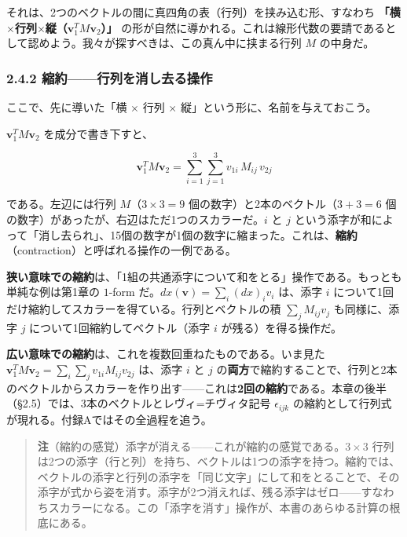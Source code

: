 \documentclass[a4paper,12pt,openany]{book}
\begin{document}
それは、2つのベクトルの間に真四角の表（行列）を挟み込む形、すなわち
\textbf{「横}\(\times\)\textbf{行列}\(\times\)\textbf{縦（}\(\mathbf{v}_1^T M \mathbf{v}_2\)\textbf{）」}
の形が自然に導かれる。これは線形代数の要請であるとして認めよう。我々が探すべきは、この真ん中に挟まる行列
\(M\) の中身だ。

\hypertarget{ux7e2eux7d04ux884cux5217ux3092ux6d88ux3057ux53bbux308bux64cdux4f5c}{%
\subsubsection{2.4.2
縮約——行列を消し去る操作}\label{ux7e2eux7d04ux884cux5217ux3092ux6d88ux3057ux53bbux308bux64cdux4f5c}}

ここで、先に導いた「横 \(\times\) 行列 \(\times\)
縦」という形に、名前を与えておこう。

\(\mathbf{v}_1^T M \mathbf{v}_2\) を成分で書き下すと、

\[
\mathbf{v}_1^T M \mathbf{v}_2 = \sum_{i=1}^3 \sum_{j=1}^3 v_{1i}\, M_{ij}\, v_{2j}
\]

である。左辺には行列 \(M\)（\(3 \times 3 = 9\)
個の数字）と2本のベクトル（\(3+3=6\)
個の数字）があったが、右辺はただ1つのスカラーだ。\(i\) と \(j\)
という添字が和によって「消し去られ」、15個の数字が1個の数字に縮まった。これは、\textbf{縮約}（contraction）と呼ばれる操作の一例である。

\textbf{狭い意味での縮約}は、「1組の共通添字について和をとる」操作である。もっとも単純な例は第1章の
\(1\)-form だ。\(dx(\mathbf{v}) = \sum_i (dx)_i v_i\) は、添字 \(i\)
について1回だけ縮約してスカラーを得ている。行列とベクトルの積
\(\sum_j M_{ij} v_j\) も同様に、添字 \(j\)
について1回縮約してベクトル（添字 \(i\) が残る）を得る操作だ。

\textbf{広い意味での縮約}は、これを複数回重ねたものである。いま見た
\(\mathbf{v}_1^T M \mathbf{v}_2 = \sum_i \sum_j v_{1i} M_{ij} v_{2j}\)
は、添字 \(i\) と \(j\)
の\textbf{両方}で縮約することで、行列と2本のベクトルからスカラーを作り出す——これは\textbf{2回の縮約}である。本章の後半（§2.5）では、3本のベクトルとレヴィ=チヴィタ記号
\(\epsilon_{ijk}\)
の縮約として行列式が現れる。付録Aではその全過程を追う。

\begin{quote}
\textbf{注}（縮約の感覚）添字が消える——これが縮約の感覚である。\(3 \times 3\)
行列は2つの添字（行と列）を持ち、ベクトルは1つの添字を持つ。縮約では、ベクトルの添字と行列の添字を「同じ文字」にして和をとることで、その添字が式から姿を消す。添字が2つ消えれば、残る添字はゼロ——すなわちスカラーになる。この「添字を消す」操作が、本書のあらゆる計算の根底にある。
\end{quote}
\end{document}
